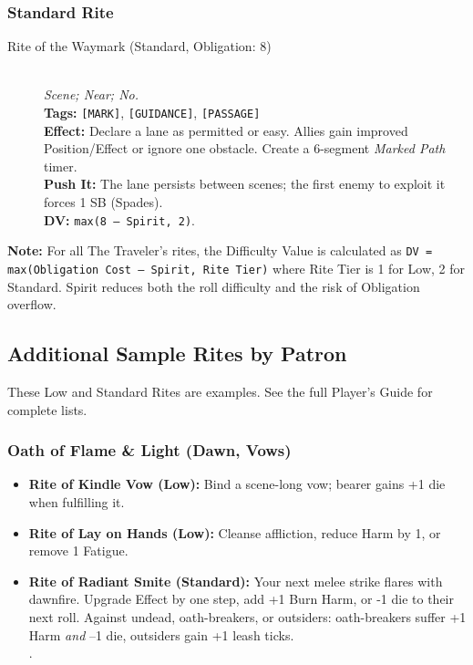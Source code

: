 \subsubsection{Standard Rite}

\begin{description}
  \item[Rite of the Waymark (Standard, Obligation: 8)] \hfill \\
  \textit{Scene; Near; No.} \\
  \textbf{Tags:} \texttt{[MARK]}, \texttt{[GUIDANCE]}, \texttt{[PASSAGE]} \\
  \textbf{Effect:} Declare a lane as permitted or easy. Allies gain improved Position/Effect or ignore one obstacle. Create a 6-segment \textit{Marked Path} timer. \\
  \textbf{Push It:} The lane persists between scenes; the first enemy to exploit it forces 1 SB (Spades). \\
  \textbf{DV:} \texttt{max(8 -- Spirit, 2)}.
\end{description}

\noindent \textbf{Note:} For all The Traveler's rites, the Difficulty Value is calculated as \texttt{DV = max(Obligation Cost -- Spirit, Rite Tier)} where Rite Tier is 1 for Low, 2 for Standard. Spirit reduces both the roll difficulty and the risk of Obligation overflow.

\subsection{Additional Sample Rites by Patron}

These Low and Standard Rites are examples. See the full Player's Guide for complete lists.

\subsubsection{Oath of Flame \& Light (Dawn, Vows)}
\begin{itemize}
  \item \textbf{Rite of Kindle Vow (Low):} Bind a scene-long vow; bearer gains +1 die when fulfilling it.
  \item \textbf{Rite of Lay on Hands (Low):} Cleanse affliction, reduce Harm by 1, or remove 1 Fatigue.
  \item \textbf{Rite of Radiant Smite (Standard):} Your next melee strike flares with dawnfire. Upgrade Effect by one step, add +1 Burn Harm, or -1 die to their next roll. Against undead, oath-breakers, or outsiders: oath-breakers suffer +1 Harm \textit{and} --1 die, outsiders gain +1 leash ticks. \\
  .
\end{itemize}

